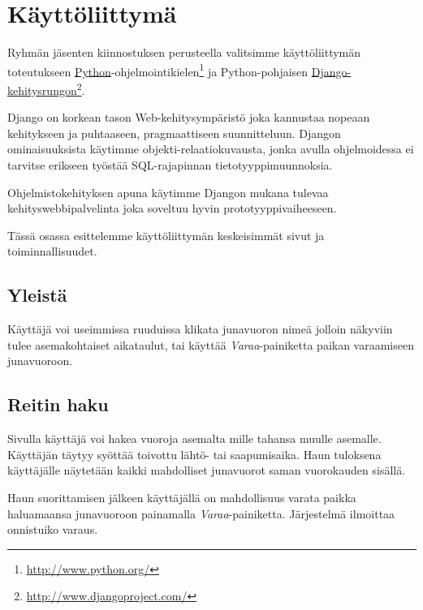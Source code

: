 \documentclass[a4paper,twoside,titlepage,12pt]{article}
\begin{document}
\section{Käyttöliittymä}

Ryhmän jäsenten kiinnostuksen perusteella valitsimme käyttöliittymän toteutukseen \href{http://www.python.org/}{Python}-ohjelmointikielen\footnote{\url{http://www.python.org/}} ja Python-pohjaisen \href{http://www.djangoproject.com/}{Django-kehitysrungon}\footnote{\url{http://www.djangoproject.com/}}.

Django on korkean tason Web-kehitysympäristö joka kannustaa nopeaan kehitykseen ja puhtaaseen, pragmaattiseen suunnitteluun. Djangon ominaisuuksista käytimme objekti-relaatiokuvausta, jonka avulla ohjelmoidessa ei tarvitse erikseen työstää SQL-rajapinnan tietotyyppimuunnoksia.

Ohjelmistokehityksen apuna käytimme Djangon mukana tulevaa kehityswebbipalvelinta joka soveltuu hyvin prototyyppivaiheeseen.

Tässä osassa esittelemme käyttöliittymän keskeisimmät sivut ja toiminnallisuudet.

\subsection{Yleistä}
Käyttäjä voi useimmissa ruuduissa klikata junavuoron nimeä jolloin näkyviin tulee asemakohtaiset aikataulut, tai käyttää \emph{Varaa}-painiketta paikan varaamiseen junavuoroon.

\subsection{Reitin haku}
Sivulla käyttäjä voi hakea vuoroja asemalta mille tahansa muulle asemalle. Käyttäjän täytyy syöttää toivottu lähtö- tai saapumisaika. Haun tuloksena käyttäjälle näytetään kaikki mahdolliset junavuorot saman vuorokauden sisällä.

Haun suorittamisen jälkeen käyttäjällä on mahdollisuus varata paikka haluamaansa junavuoroon painamalla \emph{Varaa}-painiketta. Järjestelmä ilmoittaa onnistuiko varaus.
\end{document}
